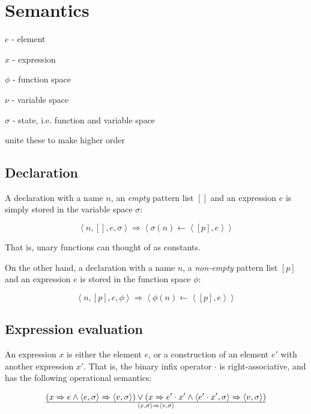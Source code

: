 \section{Semantics}

$e$ - element

$x$ - expression

$\phi$ - function space

$\nu$ - variable space

$\sigma$ - state, i.e. function and variable space

unite these to make \D{} higher order

\subsection{Declaration}

A declaration with a name $n$, an \emph{empty} pattern list $[]$ and an
expression $e$ is simply stored in the variable space $\sigma$:

\begin{equation}\label{sem:declaration}
\left\langle n, [], e, \sigma\right\rangle
\Longrightarrow
\left\langle \sigma(n)\leftarrow \left\langle [p], e\right\rangle\right\rangle
\end{equation}

That is, unary functions can thought of as constants.

On the other hand, a declaration with a name $n$, a \emph{non-empty} pattern
list $[p]$ and an expression $e$ is stored in the function space $\phi$:

\begin{equation}\label{sem:declaration}
\left\langle n, [p], e, \phi\right\rangle
\Longrightarrow
\left\langle \phi(n)\leftarrow \left\langle [p], e\right\rangle\right\rangle
\end{equation}

\subsection{Expression evaluation}

An expression $x$ is either the element $e$, or a construction of an element
$e'$ with another expression $x'$. That is, the binary infix operator $\cdot$
is right-associative, and has the following operational semantics:

\begin{equation}
{
\left(
    x\Rightarrow e
  \wedge
    \left\langle e,\sigma\right\rangle
    \Rightarrow
    \left\langle v,\sigma\right\rangle
\right)
\vee
\left(
    x\Rightarrow e'\cdot x'
  \wedge
    \left\langle e'\cdot x',\sigma\right\rangle
    \Rightarrow
    \left\langle v,\sigma\right\rangle
\right)
}\over{
  \left\langle x,\sigma\right\rangle
  \Rightarrow
  \left\langle v,\sigma\right\rangle
}
\end{equation}

